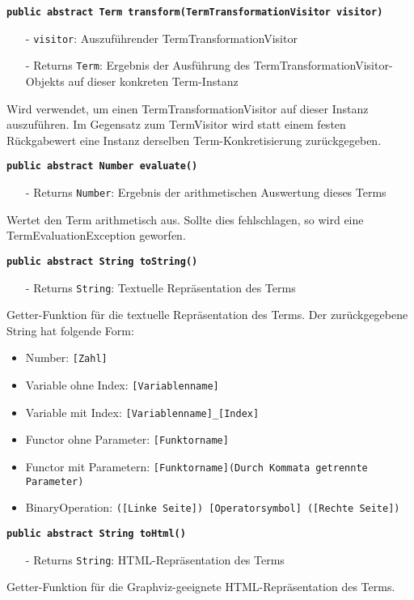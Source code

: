 \documentclass[parskip=full,11pt,twoside]{scrartcl}
\begin{document}
\textbf{\texttt{public abstract Term transform(TermTransformationVisitor visitor)}}
\begin{itemize}[noitemsep]
	\item[-] \texttt{visitor}: Auszuführender TermTransformationVisitor 
	\item[-] Returns \texttt{Term}: Ergebnis der Ausführung des TermTransformationVisitor-Objekts auf dieser konkreten Term-Instanz
\end{itemize}
Wird verwendet, um einen TermTransformationVisitor auf dieser Instanz auszuführen. Im Gegensatz zum TermVisitor wird statt einem festen Rückgabewert eine Instanz derselben Term-Konkretisierung zurückgegeben.

\textbf{\texttt{public abstract Number evaluate()}}
\begin{itemize}[noitemsep]
	\item[-] Returns \texttt{Number}: Ergebnis der arithmetischen Auswertung dieses Terms
\end{itemize}
Wertet den Term arithmetisch aus. Sollte dies fehlschlagen, so wird eine TermEvaluationException geworfen.

\textbf{\texttt{public abstract String toString()}}
\begin{itemize}[noitemsep]
	\item[-] Returns \texttt{String}: Textuelle Repräsentation des Terms
\end{itemize}
Getter-Funktion für die textuelle Repräsentation des Terms. Der zurückgegebene String hat folgende Form:
\begin{itemize}
	\item Number: \texttt{[Zahl]}
	\item Variable ohne Index: \texttt{[Variablenname]}
	\item Variable mit Index: \texttt{[Variablenname]\_[Index]}
	\item Functor ohne Parameter: \texttt{[Funktorname]}
	\item Functor mit Parametern: \texttt{[Funktorname](Durch Kommata getrennte Parameter)}
	\item BinaryOperation: \texttt{([Linke Seite]) [Operatorsymbol] ([Rechte Seite])}
\end{itemize}

\textbf{\texttt{public abstract String toHtml()}}
\begin{itemize}[noitemsep]
	\item[-] Returns \texttt{String}: HTML-Repräsentation des Terms
\end{itemize}
Getter-Funktion für die Graphviz-geeignete HTML-Repräsentation des Terms.
\end{document}
